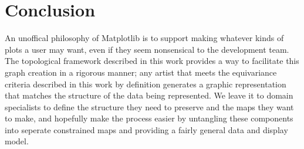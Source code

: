 \documentclass[../main.tex]{subfiles}
\begin{document}
\section{Conclusion}
An unoffical philosophy of Matplotlib is to support making whatever kinds of plots a user may want, even if they seem nonsensical to the development team. The topological framework described in this work provides a way to facilitate this graph creation in a rigorous manner; any artist that meets the equivariance criteria described in this work by definition generates a graphic representation that matches the structure of the data being represented. We leave it to domain specialists to define the structure they need to preserve and the maps they want to make, and hopefully make the process easier by untangling these components into seperate constrained maps and providing a fairly general data and display model. 
\end{document}
